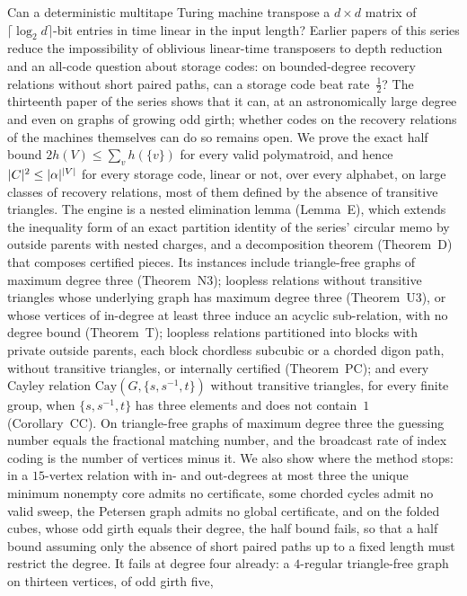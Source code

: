 Can a deterministic multitape Turing machine transpose a $d\times d$ matrix of $\lceil\log_2d\rceil$-bit entries in time
linear in the input length? Earlier papers of this series reduce the impossibility of oblivious linear-time transposers to
depth reduction and an all-code question about storage codes: on bounded-degree recovery relations without short paired
paths, can a storage code beat rate~$\frac12$? The thirteenth paper of the series shows that it can, at an
astronomically large degree and even on graphs of growing odd girth; whether codes on the recovery relations of the
machines themselves can do so remains open. We prove the exact half bound $2h(V)\le\sum_vh(\{v\})$ for every valid
polymatroid, and hence $\lvert C \rvert^2\le\lvert \alpha \rvert^{\lvert V \rvert}$ for every storage code, linear or not, over every alphabet, on
large classes of recovery relations, most of them defined by the absence of transitive triangles. The engine is a nested
elimination lemma (Lemma~E), which extends the inequality form of an exact partition identity of the series' circular
memo by outside parents with nested charges, and a decomposition theorem (Theorem~D) that composes certified pieces. Its
instances include triangle-free graphs of maximum degree three (Theorem~N3); loopless relations without transitive
triangles whose underlying graph has maximum degree three (Theorem~U3), or whose vertices of in-degree at least three
induce an acyclic sub-relation, with no degree bound (Theorem~T); loopless relations partitioned into blocks with private
outside parents, each block chordless subcubic or a chorded digon path, without transitive triangles, or internally
certified (Theorem~PC); and every Cayley relation $\mathrm{Cay}(G,\{s,s^{-1},t\})$ without transitive triangles, for every
finite group, when $\{s,s^{-1},t\}$ has three elements and does not contain~$1$ (Corollary~CC). On triangle-free graphs of
maximum degree three the guessing number equals the fractional matching number, and the broadcast rate of index coding is
the number of vertices minus it. We also show where the method stops: in a $15$-vertex relation with in- and out-degrees
at most three the unique minimum nonempty core admits no certificate, some chorded cycles admit no valid sweep, the
Petersen graph admits no global certificate, and on the folded cubes, whose odd girth equals their degree, the half bound
fails, so that a half bound assuming only the absence of short paired paths up to a fixed length must restrict the
degree. It fails at degree four already: a $4$-regular triangle-free graph on thirteen vertices, of odd girth five,
